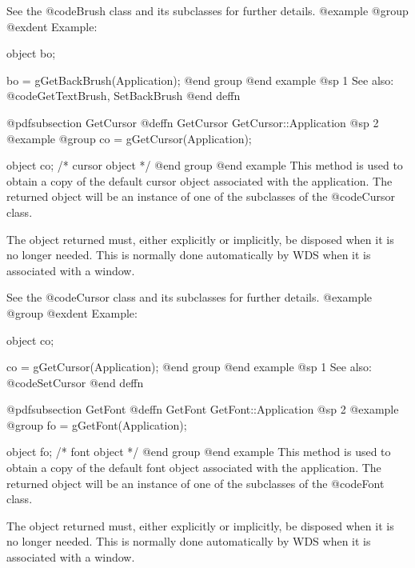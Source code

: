 See the @code{Brush} class and its subclasses for further details.
@example
@group
@exdent Example:

object  bo;

bo = gGetBackBrush(Application);
@end group
@end example
@sp 1
See also:  @code{GetTextBrush, SetBackBrush}
@end deffn























@pdfsubsection {GetCursor}
@deffn {GetCursor} GetCursor::Application
@sp 2
@example
@group
co = gGetCursor(Application);

object  co;     /*  cursor object  */
@end group
@end example
This method is used to obtain a copy of the default cursor object
associated with the application.  The returned object will be an
instance of one of the subclasses of the @code{Cursor} class.

The object returned must, either explicitly or implicitly, be
disposed when it is no longer needed.  This is normally done
automatically by WDS when it is associated with a window.

See the @code{Cursor} class and its subclasses for further details.
@example
@group
@exdent Example:

object  co;

co = gGetCursor(Application);
@end group
@end example
@sp 1
See also:  @code{SetCursor}
@end deffn
















@pdfsubsection {GetFont}
@deffn {GetFont} GetFont::Application
@sp 2
@example
@group
fo = gGetFont(Application);

object  fo;     /*  font object  */
@end group
@end example
This method is used to obtain a copy of the default font object
associated with the application.  The returned object will be an
instance of one of the subclasses of the @code{Font} class.

The object returned must, either explicitly or implicitly, be
disposed when it is no longer needed.  This is normally done
automatically by WDS when it is associated with a window.

